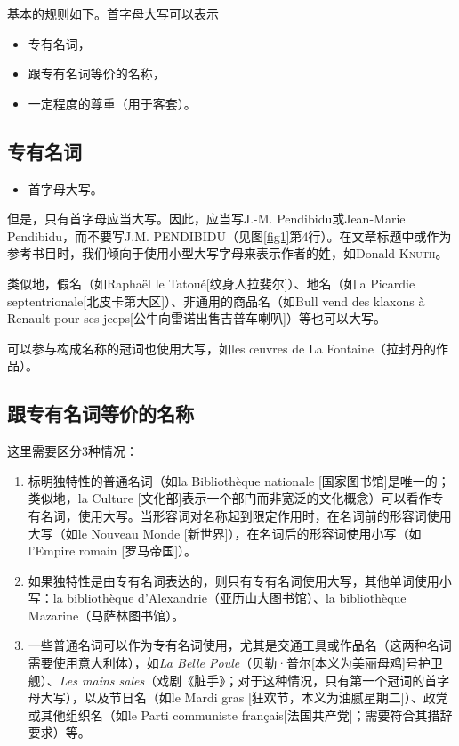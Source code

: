 基本的规则如下。首字母大写可以表示

\begin{itemize}
    \item 专有名词，
    \item 跟专有名词等价的名称，
    \item 一定程度的尊重（用于客套）。
\end{itemize}

\subsection{专有名词}

\begin{itemize}
    \item 首字母大写。
\end{itemize}

但是，只有首字母应当大写。因此，应当写J.-M. Pendibidu或Jean-Marie Pendibidu，而不要写J.M. PENDIBIDU（见图\ref{fig1}第4行）。在文章标题中或作为参考书目时，我们倾向于使用小型大写字母来表示作者的姓，如Donald \textsc{Knuth}。

类似地，假名（如Raphaël le Tatoué[纹身人拉斐尔]）、地名（如la Picardie septentrionale[北皮卡第大区]）、非通用的商品名（如Bull vend des klaxons à Renault pour ses jeeps[公牛向雷诺出售吉普车喇叭]）等也可以大写。

可以参与构成名称的冠词也使用大写，如les œuvres de La Fontaine（拉封丹的作品）。

\subsection{跟专有名词等价的名称}

这里需要区分3种情况：

\begin{enumerate}
    \item 标明独特性的普通名词（如la Bibliothèque nationale [国家图书馆]是唯一的；类似地，la Culture [文化部]表示一个部门而非宽泛的文化概念）可以看作专有名词，使用大写。当形容词对名称起到限定作用时，在名词前的形容词使用大写（如le Nouveau Monde [新世界]），在名词后的形容词使用小写（如l'Empire romain [罗马帝国]）。
    \item 如果独特性是由专有名词表达的，则只有专有名词使用大写，其他单词使用小写：la bibliothèque d'Alexandrie（亚历山大图书馆）、la bibliothèque Mazarine（马萨林图书馆）。
    \item 一些普通名词可以作为专有名词使用，尤其是交通工具或作品名（这两种名词需要使用意大利体），如\emph{La Belle Poule}（贝勒·普尔[本义为美丽母鸡]号护卫舰）、\emph{Les mains sales}（戏剧《脏手》；对于这种情况，只有第一个冠词的首字母大写），以及节日名（如le Mardi gras [狂欢节，本义为油腻星期二]）、政党或其他组织名（如le Parti communiste français[法国共产党]；需要符合其措辞要求）等。
\end{enumerate}

